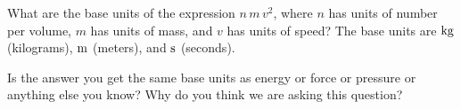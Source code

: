 \documentclass[12pt, letterpaper]{article}
\begin{document}
\begin{problem}
What are the base units of the expression $n\,m\,v^2$, where $n$
has units of number per volume, $m$ has units of mass, and $v$ has
units of speed? The base units are $\mathrm{kg}$ (kilograms), $\mathrm{m}$ (meters),
and $\mathrm{s}$ (seconds).

Is the answer you get the same base units as energy or force or
pressure or anything else you know? Why do you think we are asking
this question?
\end{problem}
\end{document}
